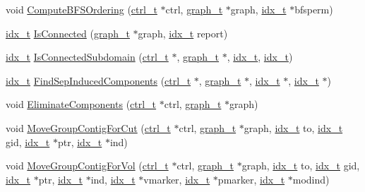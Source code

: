 \begin{DoxyCompactItemize}
\item 
void \hyperlink{a00945_a5a549d240e59b4a6dedd991e0c4e82c1}{Compute\+B\+F\+S\+Ordering} (\hyperlink{a00742}{ctrl\+\_\+t} $\ast$ctrl, \hyperlink{a00734}{graph\+\_\+t} $\ast$graph, \hyperlink{a00876_aaa5262be3e700770163401acb0150f52}{idx\+\_\+t} $\ast$bfsperm)
\item 
\hyperlink{a00876_aaa5262be3e700770163401acb0150f52}{idx\+\_\+t} \hyperlink{a00945_a06638e74c8e49f9fb9881b960f8c4f05}{Is\+Connected} (\hyperlink{a00734}{graph\+\_\+t} $\ast$graph, \hyperlink{a00876_aaa5262be3e700770163401acb0150f52}{idx\+\_\+t} report)
\item 
\hyperlink{a00876_aaa5262be3e700770163401acb0150f52}{idx\+\_\+t} \hyperlink{a00945_a123c09e42bbe2336d7abe9b0ddbe9b98}{Is\+Connected\+Subdomain} (\hyperlink{a00742}{ctrl\+\_\+t} $\ast$, \hyperlink{a00734}{graph\+\_\+t} $\ast$, \hyperlink{a00876_aaa5262be3e700770163401acb0150f52}{idx\+\_\+t}, \hyperlink{a00876_aaa5262be3e700770163401acb0150f52}{idx\+\_\+t})
\item 
\hyperlink{a00876_aaa5262be3e700770163401acb0150f52}{idx\+\_\+t} \hyperlink{a00945_a4f078e6f4dfe1e0fe00dd544dff52a21}{Find\+Sep\+Induced\+Components} (\hyperlink{a00742}{ctrl\+\_\+t} $\ast$, \hyperlink{a00734}{graph\+\_\+t} $\ast$, \hyperlink{a00876_aaa5262be3e700770163401acb0150f52}{idx\+\_\+t} $\ast$, \hyperlink{a00876_aaa5262be3e700770163401acb0150f52}{idx\+\_\+t} $\ast$)
\item 
void \hyperlink{a00945_a002ad59e8624946cc9450cb9b3c10741}{Eliminate\+Components} (\hyperlink{a00742}{ctrl\+\_\+t} $\ast$ctrl, \hyperlink{a00734}{graph\+\_\+t} $\ast$graph)
\item 
void \hyperlink{a00945_a59be93c110982dd4b4e918957804e3b7}{Move\+Group\+Contig\+For\+Cut} (\hyperlink{a00742}{ctrl\+\_\+t} $\ast$ctrl, \hyperlink{a00734}{graph\+\_\+t} $\ast$graph, \hyperlink{a00876_aaa5262be3e700770163401acb0150f52}{idx\+\_\+t} to, \hyperlink{a00876_aaa5262be3e700770163401acb0150f52}{idx\+\_\+t} gid, \hyperlink{a00876_aaa5262be3e700770163401acb0150f52}{idx\+\_\+t} $\ast$ptr, \hyperlink{a00876_aaa5262be3e700770163401acb0150f52}{idx\+\_\+t} $\ast$ind)
\item 
void \hyperlink{a00945_ac9671fbb0e67a5e8bee0d578ebcd0382}{Move\+Group\+Contig\+For\+Vol} (\hyperlink{a00742}{ctrl\+\_\+t} $\ast$ctrl, \hyperlink{a00734}{graph\+\_\+t} $\ast$graph, \hyperlink{a00876_aaa5262be3e700770163401acb0150f52}{idx\+\_\+t} to, \hyperlink{a00876_aaa5262be3e700770163401acb0150f52}{idx\+\_\+t} gid, \hyperlink{a00876_aaa5262be3e700770163401acb0150f52}{idx\+\_\+t} $\ast$ptr, \hyperlink{a00876_aaa5262be3e700770163401acb0150f52}{idx\+\_\+t} $\ast$ind, \hyperlink{a00876_aaa5262be3e700770163401acb0150f52}{idx\+\_\+t} $\ast$vmarker, \hyperlink{a00876_aaa5262be3e700770163401acb0150f52}{idx\+\_\+t} $\ast$pmarker, \hyperlink{a00876_aaa5262be3e700770163401acb0150f52}{idx\+\_\+t} $\ast$modind)

\end{DoxyCompactItemize}
